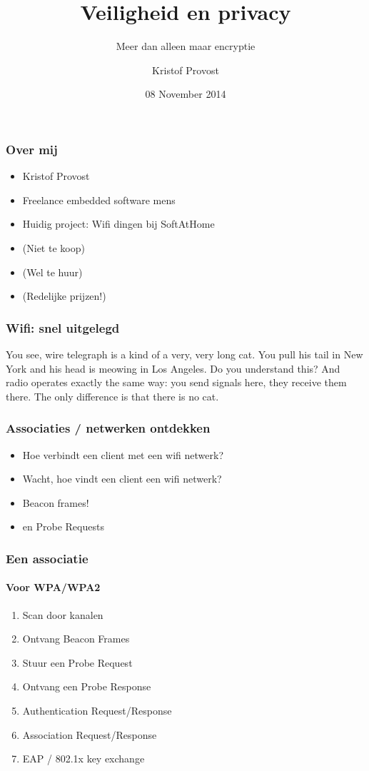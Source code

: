 \documentclass{beamer}
\title{Veiligheid en privacy}
\subtitle{Meer dan alleen maar encryptie}
\author{Kristof Provost}
\date{08 November 2014}
\begin{document}
  \frame{\titlepage}

  \begin{frame}
    \frametitle{Over mij}
    \begin{itemize}
      \item Kristof Provost
      \item Freelance embedded software mens
      \item Huidig project: Wifi dingen bij SoftAtHome
        \pause
      \item (Niet te koop)
        \pause
      \item (Wel te huur)
        \pause
      \item (Redelijke prijzen!)
    \end{itemize}
  \end{frame}

  \begin{frame}
    \frametitle{Wifi: snel uitgelegd}
    You see, wire telegraph is a kind of a very, very long cat.  You pull his
    tail in New York and his head is meowing in Los Angeles.  Do you understand
    this? And radio operates exactly the same way: you send signals here, they
    receive them there.  The only difference is that there is no cat.
  \end{frame}

  \begin{frame}
    \frametitle{Associaties / netwerken ontdekken}

    \begin{itemize}
      \item Hoe verbindt een client met een wifi netwerk?
        \pause
      \item Wacht, hoe vindt een client een wifi netwerk?
        \pause
      \item Beacon frames!
        \pause
      \item en Probe Requests
    \end{itemize}
  \end{frame}

  \begin{frame}
    \frametitle{Een associatie}
    \framesubtitle{Voor WPA/WPA2}

    \begin{enumerate}
      \item Scan door kanalen
        \pause
      \item Ontvang Beacon Frames
        \pause
      \item Stuur een Probe Request
        \pause
      \item Ontvang een Probe Response
        \pause
      \item Authentication Request/Response
      \item Association Request/Response
        \pause
      \item EAP / 802.1x key exchange
    \end{enumerate}
  \end{frame}
\end{document}
